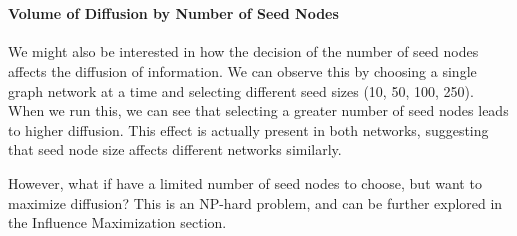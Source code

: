 \documentclass[11pt]{article}
\begin{document}
    \begin{center}
    \end{center}
    { \hspace*{\fill} \\}
    
    \hypertarget{volume-of-diffusion-by-number-of-seed-nodes}{%
\paragraph{Volume of Diffusion by Number of Seed
Nodes}\label{volume-of-diffusion-by-number-of-seed-nodes}}

    We might also be interested in how the decision of the number of seed
nodes affects the diffusion of information. We can observe this by
choosing a single graph network at a time and selecting different seed
sizes (10, 50, 100, 250). When we run this, we can see that selecting a
greater number of seed nodes leads to higher diffusion. This effect is
actually present in both networks, suggesting that seed node size
affects different networks similarly.

However, what if have a limited number of seed nodes to choose, but want
to maximize diffusion? This is an NP-hard problem, and can be further
explored in the Influence Maximization section.
\end{document}
